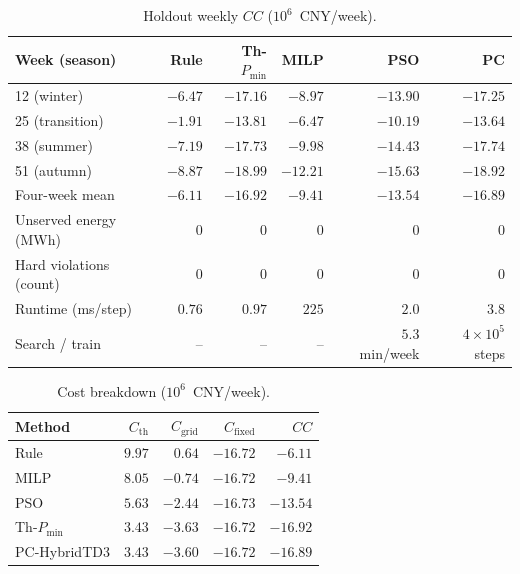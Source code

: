 \documentclass[conference]{IEEEtran}
\begin{document}
\begin{table}[!t]
\caption{Holdout weekly \(CC\) (\(10^6\)~CNY/week).}
\label{tab:kpi}
\centering
\scriptsize
\setlength{\tabcolsep}{1.8pt}
\begin{tabular}{@{}lrrrrr@{}}
\toprule
Week (season) & Rule & Th-\(P_{\min}\) & MILP & PSO & PC \\
\midrule
12 (winter) & \(-6.47\) & \(-17.16\) & \(-8.97\) & \(-13.90\) & \(-17.25\) \\
25 (transition) & \(-1.91\) & \(-13.81\) & \(-6.47\) & \(-10.19\) & \(-13.64\) \\
38 (summer) & \(-7.19\) & \(-17.73\) & \(-9.98\) & \(-14.43\) & \(-17.74\) \\
51 (autumn) & \(-8.87\) & \(-18.99\) & \(-12.21\) & \(-15.63\) & \(-18.92\) \\
Four-week mean & \(-6.11\) & \(-16.92\) & \(-9.41\) & \(-13.54\) & \(-16.89\) \\
Unserved energy (MWh) & \(0\) & \(0\) & \(0\) & \(0\) & \(0\) \\
Hard violations (count) & \(0\) & \(0\) & \(0\) & \(0\) & \(0\) \\
Runtime (ms/step) & \(0.76\) & \(0.97\) & \(225\) & \(2.0\) & \(3.8\) \\
Search / train & -- & -- & -- & \(5.3\)~min/week & \(4\times10^{5}\) steps \\
\bottomrule
\end{tabular}
\end{table}

\begin{table}[!t]
\caption{Cost breakdown (\(10^6\)~CNY/week).}
\label{tab:decomp}
\centering
\scriptsize
\setlength{\tabcolsep}{3.0pt}
\begin{tabular}{@{}lrrrr@{}}
\toprule
Method & \(C_{\mathrm{th}}\) & \(C_{\mathrm{grid}}\) & \(C_{\mathrm{fixed}}\) & \(CC\) \\
\midrule
Rule & \(9.97\) & \(0.64\) & \(-16.72\) & \(-6.11\) \\
MILP & \(8.05\) & \(-0.74\) & \(-16.72\) & \(-9.41\) \\
PSO & \(5.63\) & \(-2.44\) & \(-16.73\) & \(-13.54\) \\
Th-\(P_{\min}\) & \(3.43\) & \(-3.63\) & \(-16.72\) & \(-16.92\) \\
PC-HybridTD3 & \(3.43\) & \(-3.60\) & \(-16.72\) & \(-16.89\) \\
\bottomrule
\end{tabular}
\end{table}
\end{document}

